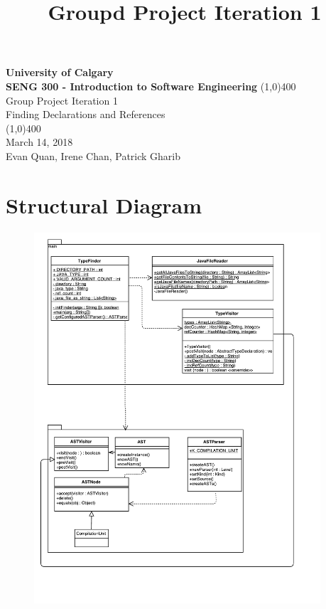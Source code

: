 \documentclass[12p]{article}
\title{\vspace{-6ex}Groupd Project Iteration 1}
\date{\vspace{-12ex}}
\begin{document}
\thispagestyle{fancy}

\begin{titlepage}
  \begin{center}
    \vspace{1cm}
    \Large{\textbf{University of Calgary}}\\
    \Large{\textbf{SENG 300  - Introduction to Software Engineering}}
    \vfill
    \line(1,0){400}\\[1mm]
    \huge{Group Project Iteration 1}\\
    \large{Finding Declarations and References}\\
    \line(1,0){400}\\
    \Large March 14, 2018\\
    \vfill
    \large{Evan Quan, Irene Chan, Patrick Gharib}\\
  \end{center}
\end{titlepage}

%
%

\section{Structural Diagram}
\begin{figure}[H]
  \includegraphics[width=0.95\textwidth]{SengUml.pdf}
  \caption{} %
  \label{fig:structural}
\end{figure}
\end{document}
